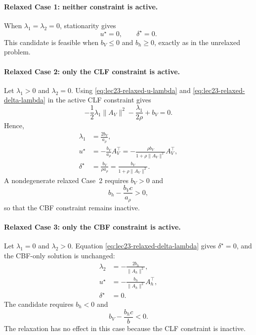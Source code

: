 \documentclass[../../master-handout.tex]{subfiles}
\begin{document}
\paragraph{Relaxed Case 1: neither constraint is active.}

When $\lambda_1=\lambda_2=0$, stationarity gives
\begin{equation}
    u^\star=0,
    \qquad
    \delta^\star=0.
\end{equation}
This candidate is feasible when $b_V\leq 0$ and $b_h\geq 0$, exactly as in the unrelaxed problem.

\paragraph{Relaxed Case 2: only the CLF constraint is active.}

Let $\lambda_1>0$ and $\lambda_2=0$. Using \eqref{eq:lec23-relaxed-u-lambda} and \eqref{eq:lec23-relaxed-delta-lambda} in the active CLF constraint gives
\begin{equation}
    -\frac{1}{2}\lambda_1\|A_V\|^2
    -
    \frac{\lambda_1}{2\rho}
    +
    b_V
    =
    0.
\end{equation}
Hence,
\begin{align}
    \lambda_1
    &=
    \frac{2b_V}{a_\rho},
    \label{eq:lec23-relaxed-case2-lambda}
    \\
    u^\star
    &=
    -\frac{b_V}{a_\rho}A_V^\top
    =
    -\frac{\rho b_V}{1+\rho\|A_V\|^2}A_V^\top,
    \label{eq:lec23-relaxed-case2-u}
    \\
    \delta^\star
    &=
    \frac{b_V}{\rho a_\rho}
    =
    \frac{b_V}{1+\rho\|A_V\|^2}.
    \label{eq:lec23-relaxed-case2-delta}
\end{align}
A nondegenerate relaxed Case~2 requires $b_V>0$ and
\begin{equation}
    b_h-\frac{b_Vc}{a_\rho}>0,
\end{equation}
so that the CBF constraint remains inactive.

\paragraph{Relaxed Case 3: only the CBF constraint is active.}

Let $\lambda_1=0$ and $\lambda_2>0$. Equation \eqref{eq:lec23-relaxed-delta-lambda} gives $\delta^\star=0$, and the CBF-only solution is unchanged:
\begin{align}
    \lambda_2
    &=
    -\frac{2b_h}{\|A_h\|^2},
    \\
    u^\star
    &=
    -\frac{b_h}{\|A_h\|^2}A_h^\top,
    \\
    \delta^\star
    &=0.
    \label{eq:lec23-relaxed-case3}
\end{align}
The candidate requires $b_h<0$ and
\begin{equation}
    b_V-\frac{b_hc}{b}<0.
\end{equation}
The relaxation has no effect in this case because the CLF constraint is inactive.
\end{document}
